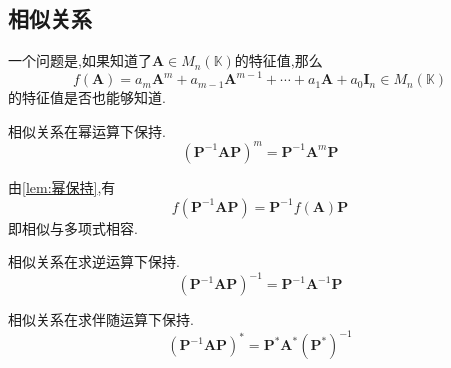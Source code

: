 \subsection{相似关系}
\begin{red}
\begin{remark}
    一个问题是,如果知道了$\bm{A}\in M_n\left(
        \mathbb{K}
    \right)$的特征值,那么
    \[
    f\left(
        \bm{A}
    \right)=a_m\bm{A}^m+a_{m-1}\bm{A}^{m-1}+\cdots+a_1\bm{A}+a_0\bm{I}_n\in M_n\left(
        \mathbb{K}
    \right)
    \]的特征值是否也能够知道.
\end{remark}
\end{red}
\begin{green}
\begin{lemma}[幂保持]\label{lem:幂保持}
    相似关系在幂运算下保持.
    \[
    \left(
        \bm{P}^{-1}\bm{AP}   
    \right)^m=\bm{P}^{-1}\bm{A}^m\bm{P}
    \]
\end{lemma}
\end{green}
\begin{green}
\begin{corollary}[相似与多项式相容]\label{cor:相似与多项式相容}
    由\cref{lem:幂保持},有
    \[
f\left(
    \bm{P}^  {-1}\bm{AP}
\right)= \bm{P}^{-1}f\left(
    \bm{A}
\right)\bm{P}
\]即相似与多项式相容.
\end{corollary}
\end{green}
\begin{green}
\begin{corollary}[求逆保持]\label{cor:求逆保持}
    相似关系在求逆运算下保持.
    \[
    \left(
        \bm{P}^{-1}\bm{AP}
    \right)^{-1}=\bm{P}^{-1}\bm{A}^{-1}\bm{P}
    \]
\end{corollary}
\end{green}
\begin{green}
\begin{corollary}[求伴随保持]\label{cor:求伴随保持}
    相似关系在求伴随运算下保持.
    \[
    \left(
        \bm{P}^{-1}\bm{AP}
    \right)^*=\bm{P}^*\bm{A}^*\left(
        \bm{P}^*
    \right)^{-1}
    \]
\end{corollary}
\end{green}
